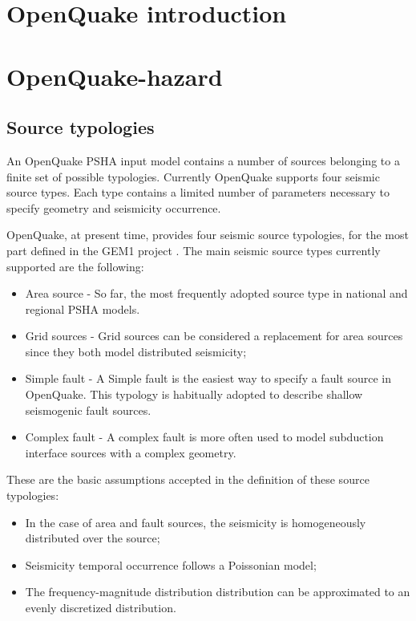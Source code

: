 \section{OpenQuake introduction}
\section{OpenQuake-hazard}
\subsection{Source typologies}
An OpenQuake PSHA input model contains a number of sources belonging 
to a finite set of possible typologies. Currently OpenQuake supports
four seismic source types. Each type contains a limited number of 
parameters necessary to specify geometry and seismicity occurrence.

OpenQuake, at present time, provides four seismic source typologies, 
for the most part defined in the GEM1 project \citep{pagani2010}. 
%
The main seismic source types currently supported are the following:
\begin{itemize}
\item Area source - So far, the most frequently adopted source 
type in national and regional PSHA models.
\item Grid sources - Grid sources can be considered a replacement 
for area sources since they both model distributed seismicity;
\item Simple fault - A Simple fault is the easiest way to
specify a fault source in OpenQuake. This typology is habitually adopted 
to describe shallow seismogenic fault sources.
\item Complex fault - A complex fault is more often used 
to model subduction interface sources with a complex geometry. 
\end{itemize}

These are the basic assumptions accepted in the definition of these source 
typologies:
\begin{itemize}
\item In the case of area and fault sources, the seismicity is homogeneously 
distributed over the source; 
\item Seismicity temporal occurrence follows a Poissonian model; 
\item The frequency-magnitude distribution distribution can be approximated 
to an evenly discretized distribution. 
\end{itemize}
%
